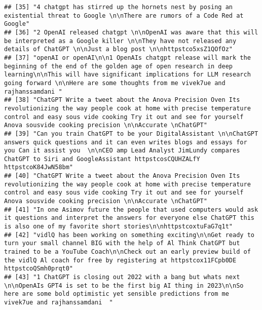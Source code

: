 \documentclass[
]{article}
\begin{document}
\begin{verbatim}
## [35] "4 chatgpt has stirred up the hornets nest by posing an existential threat to Google \n\nThere are rumors of a Code Red at Google"                                                                                                                                                                                  
## [36] "2 OpenAI released chatgpt \n\nOpenAI was aware that this will be interpreted as a Google killer \n\nThey have not released any details of ChatGPT \n\nJust a blog post \n\nhttpstco5xsZ1QOfOz"                                                                                                                     
## [37] "openAI or openAI\n\n1 OpenAIs chatgpt release will mark the beginning of the end of the golden age of open research in deep learning\n\nThis will have significant implications for LLM research going forward \n\nHere are some thoughts from me vivek7ue and rajhanssamdani "                                    
## [38] "ChatGPT Write a tweet about the Anova Precision Oven Its revolutionizing the way people cook at home with precise temperature control and easy sous vide cooking Try it out and see for yourself Anova sousvide cooking precision \n\nAccurate \nChatGPT"                                                          
## [39] "Can you train ChatGPT to be your DigitalAssistant \n\nChatGPT answers quick questions and it can even writes blogs and essays for you Can it assist you  \n\nCEO amp Lead Analyst JimLundy compares ChatGPT to Siri and GoogleAssistant httpstcosCQUHZALfY httpstcoK84JwN58bm"                                     
## [40] "ChatGPT Write a tweet about the Anova Precision Oven Its revolutionizing the way people cook at home with precise temperature control and easy sous vide cooking Try it out and see for yourself Anova sousvide cooking precision \n\nAccurate \nChatGPT"                                                          
## [41] "In one Asimov future the people that used computers would ask it questions and interpret the answers for everyone else ChatGPT this is also one of my favorite short stories\n\nhttpstcoxtuFaG7q1t"                                                                                                                
## [42] "vidlQ has been working on something exciting\n\nGet ready to turn your small channel BIG with the help of Al Think ChatGPT but trained to be a YouTube Coach\n\nCheck out an early preview build of the vidlQ Al coach for free by registering at httpstcox11FCpb0DE httpstcoQSmh0prqt0"                           
## [43] "1 ChatGPT is closing out 2022 with a bang but whats next  \n\nOpenAIs GPT4 is set to be the first big AI thing in 2023\n\nSo here are some bold optimistic yet sensible predictions from me vivek7ue and rajhanssamdani  "                                                                                         

\end{verbatim}
\end{document}
